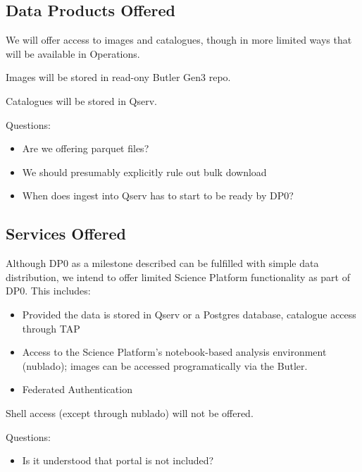 \subsection{Data Products Offered}

We will offer access to images and catalogues, though in more limited ways that will be available in Operations.

Images will be stored in read-ony Butler Gen3 repo.

Catalogues will be stored in Qserv. 

Questions:

\begin{itemize}

\item Are we offering parquet files?

\item We should presumably explicitly rule out bulk download

\item When does ingest into Qserv has to start to be ready by DP0?

\end{itemize}

\subsection{Services Offered}

Although DP0 as a milestone described  can be fulfilled with simple data distribution, we intend to offer limited Science Platform functionality as part of DP0. This includes:

\begin{itemize}

\item Provided the data is stored in Qserv or a Postgres database, catalogue access through TAP

\item Access to the Science Platform's notebook-based analysis environment (nublado); images can be accessed programatically via the Butler. 

\item Federated Authentication
   
\end{itemize}

Shell access (except through nublado) will not be offered.

Questions:

\begin{itemize}

\item Is it understood that portal is not included?

\end{itemize}


